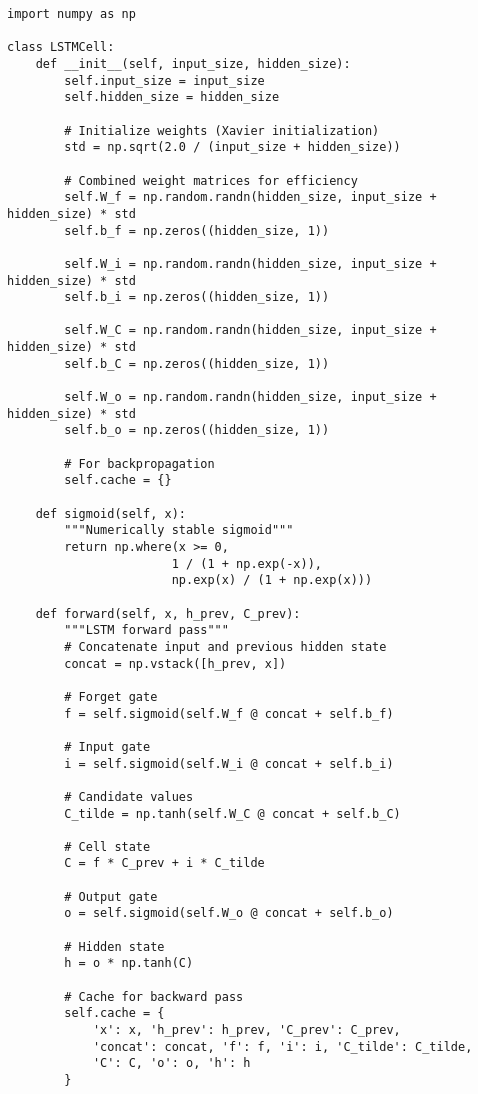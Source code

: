 ﻿\documentclass[12pt,a4paper]{article}
\begin{document}
\begin{lstlisting}
import numpy as np

class LSTMCell:
    def __init__(self, input_size, hidden_size):
        self.input_size = input_size
        self.hidden_size = hidden_size
        
        # Initialize weights (Xavier initialization)
        std = np.sqrt(2.0 / (input_size + hidden_size))
        
        # Combined weight matrices for efficiency
        self.W_f = np.random.randn(hidden_size, input_size + hidden_size) * std
        self.b_f = np.zeros((hidden_size, 1))
        
        self.W_i = np.random.randn(hidden_size, input_size + hidden_size) * std
        self.b_i = np.zeros((hidden_size, 1))
        
        self.W_C = np.random.randn(hidden_size, input_size + hidden_size) * std
        self.b_C = np.zeros((hidden_size, 1))
        
        self.W_o = np.random.randn(hidden_size, input_size + hidden_size) * std
        self.b_o = np.zeros((hidden_size, 1))
        
        # For backpropagation
        self.cache = {}
    
    def sigmoid(self, x):
        """Numerically stable sigmoid"""
        return np.where(x >= 0,
                       1 / (1 + np.exp(-x)),
                       np.exp(x) / (1 + np.exp(x)))
    
    def forward(self, x, h_prev, C_prev):
        """LSTM forward pass"""
        # Concatenate input and previous hidden state
        concat = np.vstack([h_prev, x])
        
        # Forget gate
        f = self.sigmoid(self.W_f @ concat + self.b_f)
        
        # Input gate
        i = self.sigmoid(self.W_i @ concat + self.b_i)
        
        # Candidate values
        C_tilde = np.tanh(self.W_C @ concat + self.b_C)
        
        # Cell state
        C = f * C_prev + i * C_tilde
        
        # Output gate
        o = self.sigmoid(self.W_o @ concat + self.b_o)
        
        # Hidden state
        h = o * np.tanh(C)
        
        # Cache for backward pass
        self.cache = {
            'x': x, 'h_prev': h_prev, 'C_prev': C_prev,
            'concat': concat, 'f': f, 'i': i, 'C_tilde': C_tilde,
            'C': C, 'o': o, 'h': h
        }
        

\end{lstlisting}
\end{document}
